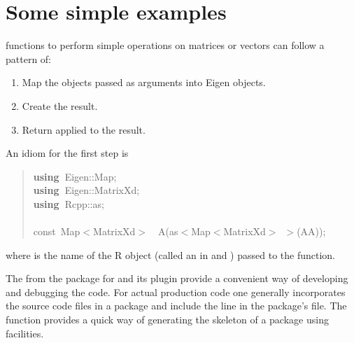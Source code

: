 \documentclass[shortnames,article]{jss}
\newcommand{\hlstd}[1]{\textcolor[rgb]{0,0,0}{#1}}
\newcommand{\hlsym}[1]{\textcolor[rgb]{0,0,0}{#1}}
\newcommand{\hlkwa}[1]{\textcolor[rgb]{0.61,0.13,0.93}{\bf{#1}}}
\newcommand{\hlkwb}[1]{\textcolor[rgb]{0.13,0.54,0.13}{#1}}
\newcommand{\hlkwd}[1]{\textcolor[rgb]{0,0,0}{#1}}
\begin{document}
\section{Some simple examples}
\label{sec:simple}

 functions to perform simple operations on matrices or
vectors can follow a pattern of:
\begin{enumerate}
\item Map the  objects passed as arguments into Eigen objects.
\item Create the result.
\item Return  applied to the result.
\end{enumerate}

An idiom for the first step is

\begin{quote}
  \noindent
  \ttfamily
  \hlstd{}\hlkwa{using\ }\hlstd{Eigen}\hlsym{::}\hlstd{Map}\hlsym{;}\hspace*{\fill}\\
  \hlstd{}\hlkwa{using\ }\hlstd{Eigen}\hlsym{::}\hlstd{MatrixXd}\hlsym{;}\hspace*{\fill}\\
  \hlstd{}\hlkwa{using\ }\hlstd{Rcpp}\hlsym{::}\hlstd{as}\hlsym{;}\hspace*{\fill}\\
  \hlstd{}\hspace*{\fill}\\
  \hlkwb{const\ }\hlstd{Map}\hlsym{$<$}\hlstd{MatrixXd}\hlsym{$>$}\hlstd{\ \ }\hlsym{}\hlstd{}\hlkwd{A}\hlstd{}\hlsym{(}\hlstd{as}\hlsym{$<$}\hlstd{Map}\hlsym{$<$}\hlstd{MatrixXd}\hlsym{$>$\ $>$(}\hlstd{AA}\hlsym{));}\hlstd{}\hspace*{\fill}\\
  \mbox{}
  \normalfont
\end{quote}
where  is the name of the R object (called an  in
 and ) passed to the  function.

The  from the  package \citep*{CRAN:inline} for
 and its  plugin provide a convenient way of
developing and debugging the  code.  For actual production code
one generally incorporates the  source code files in a package
and include the line  in the package's
 file.  The  function
provides a quick way of generating the skeleton of a package using
 facilities.
\end{document}
